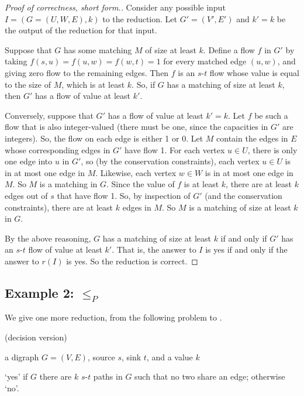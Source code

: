\begin{proof}[Proof of correctness, short form.]
  Consider any possible input $I=(G=(U,W,E), k)$ to the reduction.
  Let $G'=(V', E')$ and $k'=k$ be the output of the reduction for that input.

  Suppose that $G$ has some matching $M$ of size at least $k$.
  Define a flow $f$ in $G'$ by taking $f(s, u) = f(u, w) = f(w, t) = 1$
  for every matched edge $(u, w)$, and giving zero flow to the remaining edges.
  Then $f$ is an $s$-$t$ flow whose value is equal to the size of $M$, which is at least $k$.
  So, if $G$ has a matching of size at least $k$, then $G'$ has a flow of value at least $k'$.

  Conversely, suppose that $G'$ has a flow of value at least $k'=k$.
  Let $f$ be such a flow that is also integer-valued
  (there must be one, since the capacities in $G'$ are integers).
  So, the flow on each edge is either 1 or 0.
  Let $M$ contain the edges in $E$ whose corresponding edges in $G'$ have flow 1.
  For each vertex $u\in U$, there is only one edge into $u$ in $G'$,
  so (by the conservation constraints), each vertex $u\in U$ is in at most one edge in $M$.
  Likewise, each vertex $w\in W$ is in at most one edge in $M$. 
  So $M$ is a matching in $G$.
  Since the value of $f$ is at least $k$,
  there are at least $k$ edges out of $s$ that have flow 1.
  So, by inspection of $G'$ (and the conservation constraints),
  there are at least $k$ edges in $M$.
  So $M$ is a matching of size at least $k$ in $G$. 

  By the above reasoning, $G$ has a matching of size at least $k$
  if and only if $G'$ has an $s$-$t$ flow of value at least $k'$.
  That is, the answer to $I$ is \textsf{yes}
  if and only if the answer to $r(I)$ is \textsf{yes}.
  So the reduction is correct.
\end{proof}

\subsection{Example 2:  $\le_P$ } 
We give one more reduction, from the following problem to .

\begin{mylist}
\item[]  (decision version) \dotfill \em
\item[\bf input:] a digraph $G=(V ,E)$, source $s$, sink $t$, and a value $k$
\item[\bf output:] `\textsf{yes}' if $G$ there are $k$ $s$-$t$ paths in $G$ such that
  no two share an edge; otherwise `\textsf{no}'.
\end{mylist}

